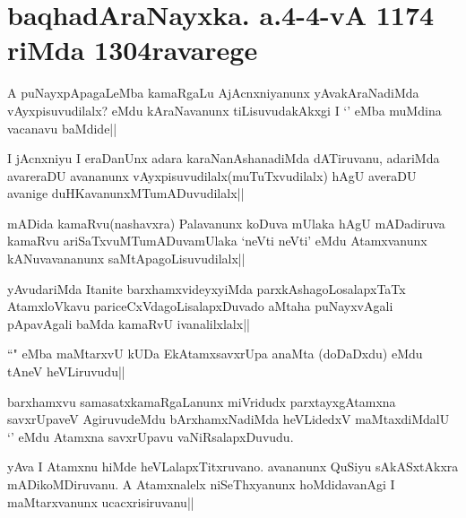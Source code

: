\section*{baqhadAraNayxka. a.4-4-vA 1174 riMda 1304ravarege}

\begin{artha}
A puNayxpApagaLeMba kamaRgaLu AjAcnxniyanunx yAvakAraNadiMda vAyxpisuvudilalx? eMdu 
kAraNavanunx tiLisuvudakAkxgi I `\stext' eMba muMdina vacanavu baMdide||
\end{artha}

\begin{artha}
I jAcnxniyu I eraDanUnx adara karaNanAshanadiMda dATiruvanu, adariMda avareraDU avananunx vAyxpisuvudilalx(muTuTxvudilalx) hAgU averaDU avanige duHKavanunxMTumADuvudilalx||
\end{artha}


\begin{artha}
mADida kamaRvu(nashavxra) Palavanunx koDuva mUlaka hAgU mADadiruva kamaRvu ariSaTxvuMTumADuvamUlaka `neVti neVti' eMdu Atamxvanunx kANuvavananunx saMtApagoLisuvudilalx||
\end{artha}


\begin{artha}
yAvudariMda Itanite barxhamxvideyxyiMda parxkAshagoLosalapxTaTx AtamxloVkavu pariceCxVdagoLisalapxDuvado aMtaha puNayxvAgali pApavAgali baMda kamaRvU ivanalilxlalx||
\end{artha}


\begin{artha}
``\stext" eMba maMtarxvU kUDa EkAtamxsavxrUpa anaMta (doDaDxdu) eMdu tAneV heVLiruvudu||
\end{artha}

\begin{artha}
barxhamxvu samasatxkamaRgaLanunx miVridudx parxtayxgAtamxna savxrUpaveV AgiruvudeMdu bArxhamxNadiMda heVLidedxV maMtaxdiMdalU `\stext' eMdu Atamxna savxrUpavu vaNiRsalapxDuvudu.
\end{artha}



\begin{artha}
yAva I Atamxnu hiMde heVLalapxTitxruvano. avananunx QuSiyu sAkASxtAkxra mADikoMDiruvanu. A Atamxnalelx niSeThxyanunx hoMdidavanAgi I maMtarxvanunx ucacxrisiruvanu||
\end{artha}

